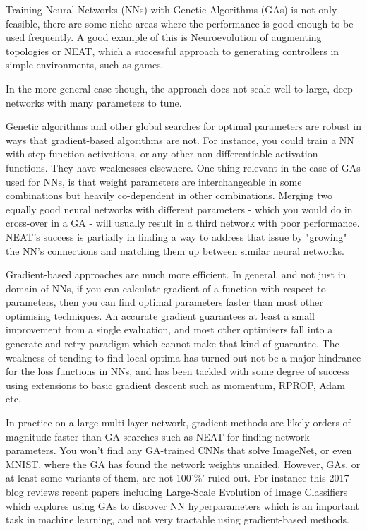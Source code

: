  Training Neural Networks (NNs) with Genetic Algorithms (GAs) is not only feasible, there are some niche areas where the performance is good enough to be used frequently. A good example of this is Neuroevolution of augmenting topologies or NEAT, which a successful approach to generating controllers in simple environments, such as games.

 In the more general case though, the approach does not scale well to large, deep networks with many parameters to tune.

 Genetic algorithms and other global searches for optimal parameters are robust in ways that gradient-based algorithms are not. For instance, you could train a NN with step function activations, or any other non-differentiable activation functions. They have weaknesses elsewhere. One thing relevant in the case of GAs used for NNs, is that weight parameters are interchangeable in some combinations but heavily co-dependent in other combinations. Merging two equally good neural networks with different parameters - which you would do in cross-over in a GA - will usually result in a third network with poor performance. NEAT's success is partially in finding a way to address that issue by "growing" the NN's connections and matching them up between similar neural networks.

 Gradient-based approaches are much more efficient. In general, and not just in domain of NNs, if you can calculate gradient of a function with respect to parameters, then you can find optimal parameters faster than most other optimising techniques. An accurate gradient guarantees at least a small improvement from a single evaluation, and most other optimisers fall into a generate-and-retry paradigm which cannot make that kind of guarantee. The weakness of tending to find local optima has turned out not be a major hindrance for the loss functions in NNs, and has been tackled with some degree of success using extensions to basic gradient descent such as momentum, RPROP, Adam etc.

 In practice on a large multi-layer network, gradient methods are likely orders of magnitude faster than GA searches such as NEAT for finding network parameters. You won't find any GA-trained CNNs that solve ImageNet, or even MNIST, where the GA has found the network weights unaided. However, GAs, or at least some variants of them, are not 100'\%' ruled out. For instance this 2017 blog reviews recent papers including Large-Scale Evolution of Image Classifiers which explores using GAs to discover NN hyperparameters which is an important task in machine learning, and not very tractable using gradient-based methods.
